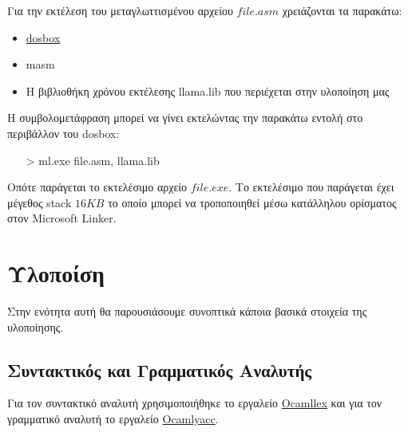 \documentclass[12pt]{article}
\begin{document}
Για την εκτέλεση του μεταγλωττισμένου αρχείου $file.asm$ χρειάζονται τα παρακάτω:
\begin{itemize}
\item \href{http://www.dosbox.com/}{dosbox}
\item masm
\item Η βιβλιοθήκη χρόνου εκτέλεσης llama.lib που περιέχεται στην υλοποίηση μας
\end{itemize}

Η συμβολομετάφραση μπορεί να γίνει εκτελώντας την παρακάτω εντολή στο περιβάλλον του dosbox:
\begin{itemize}
\item[>] ml.exe file.asm, llama.lib
\end{itemize} 
Οπότε παράγεται το εκτελέσιμο αρχείο $file.exe$.
Το εκτελέσιμο που παράγεται έχει μέγεθος stack $16KB$ το οποίο μπορεί να τροποποιηθεί μέσω κατάλληλου ορίσματος στον Microsoft Linker.
%
%
%
%
%
%
%
%
%
%
%    
%    
%
%
%
%
%
%	


\section{Υλοποίση}
Στην ενότητα αυτή θα παρουσιάσουμε συνοπτικά κάποια βασικά στοιχεία της υλοποίησης.
\subsection{Συντακτικός και Γραμματικός Αναλυτής}
Για τον συντακτικό αναλυτή χρησιμοποιήθηκε το εργαλείο \href{http://courses.softlab.ntua.gr/compilers/2012a/ocamlyacc-tutorial.pdf}{Ocamllex} και για τον γραμματικό     αναλυτή το εργαλείο \href{http://courses.softlab.ntua.gr/compilers/2012a/ocamlyacc-tutorial.pdf}{Ocamlyacc}.
\end{document}
